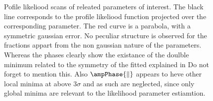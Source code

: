 \begin{figure}[h]
  \centering
  \begin{subfigure}{0.5\textwidth}
    \scalebox{0.60}{}
    \caption{}
    \label{nll_f0}
  \end{subfigure}%
  \hfill%
  \begin{subfigure}{0.5\textwidth}
    \scalebox{0.60}{}
    \caption{}
    \label{nll_fpar}
  \end{subfigure}
  \begin{subfigure}{0.5\textwidth}
    \scalebox{0.60}{}
    \caption{}
    \label{nll_AparPhase}
  \end{subfigure}%
  \hfill%
  \begin{subfigure}{0.5\textwidth}
    \scalebox{0.60}{}
    \caption{}
    \label{nll_AperpPhase}
  \end{subfigure}
\caption{Pofile likeliood scans of \pwave releated parameters of interest. The black line corresponds to the profile likeliood
         function projected over the corresponding parameter. The red curve is a parabola, with a symmetric gaussian 
         error. No peculiar structure is observed for the \pwave fractions appart from the non gaussian nature of the parameters.
         Whereas the phases clearly show the existance of the doulble minimum related to the symmetry of the fitted \pdf 
         explained in  {\color{red} Do not forget to mention this}.
         Also $\ampPhase{\parallel}$ appears to heve other local minima at above $3\sigma$ and as such are neglected, since only
         global minima are relevant to the likelihood parameter estiamtion. }
\end{figure}

\clearpage

